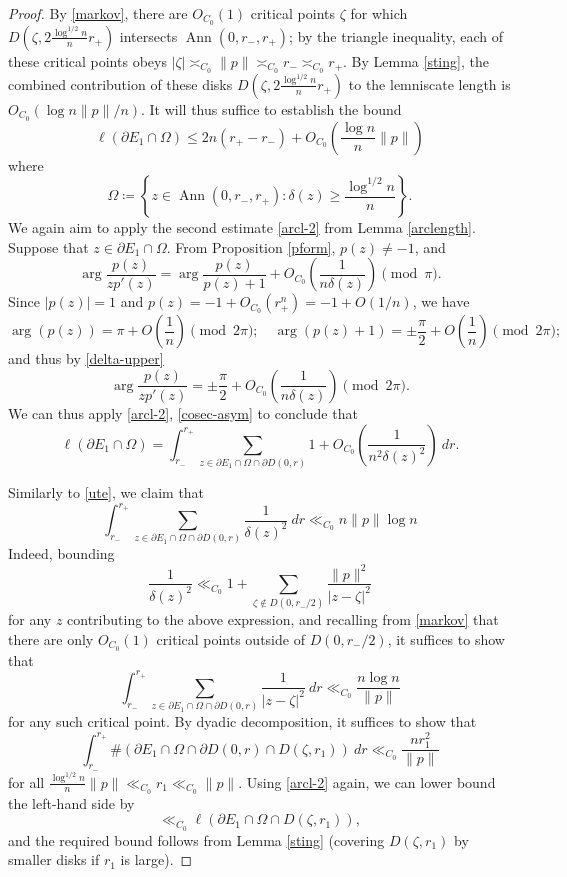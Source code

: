\documentclass[12pt]{amsart}
\renewcommand{\arg}{\operatorname{arg}}
\newcommand{\Ann}{\operatorname{Ann}}
\begin{document}
\begin{proof}
By \eqref{markov}, there are $O_{C_0}(1)$ critical points $\zeta$ for which $D(\zeta, 2\frac{\log^{1/2} n}{n} r_+)$ intersects $\Ann(0,r_-, r_+)$; by the triangle inequality, each of these critical points obeys $|\zeta| \asymp_{C_0} \|p\| \asymp_{C_0} r_- \asymp_{C_0} r_+$.  By Lemma \ref{sting}, the combined contribution of these disks $D(\zeta, 2\frac{\log^{1/2} n}{n} r_+)$ to the lemniscate length is $O_{C_0}(\log n \|p\|/n)$.
It will thus suffice to establish the bound
$$ \ell(\partial E_1 \cap \Omega) \leq 2n (r_+-r_-) + O_{C_0}\left(\frac{\log n}{n} \|p\| \right)$$
where
$$ \Omega \coloneqq \left\{ z \in \Ann(0,r_-,r_+): \delta(z) \geq \frac{\log^{1/2} n}{n} \right\}.$$
We again aim to apply the second estimate \eqref{arcl-2} from Lemma \ref{arclength}.  Suppose that $z \in \partial E_1 \cap \Omega$.
From Proposition \ref{pform}, $p(z) \neq -1$, and
$$ \arg \frac{p(z)}{zp'(z)} = \arg \frac{p(z)}{p(z)+1}
+ O_{C_0}\left(\frac{1}{n \delta(z)} \right) \pmod \pi.$$
Since $|p(z)|=1$ and $p(z) = -1 + O_{C_0}(r_+^n) = -1 + O(1/n)$, we have
$$ \arg(p(z)) = \pi + O\left(\frac{1}{n}\right) \pmod{2\pi}; \quad \arg(p(z)+1) = \pm \frac{\pi}{2} + O\left(\frac{1}{n}\right) \pmod{2\pi};$$
and thus by \eqref{delta-upper}
$$ \arg \frac{p(z)}{zp'(z)} = \pm \frac{\pi}{2} + O_{C_0}\left(\frac{1}{n \delta(z)} \right) \pmod{2\pi}.$$
We can thus apply \eqref{arcl-2}, \eqref{cosec-asym} to conclude that
$$
 \ell(\partial E_1 \cap \Omega) = \int_{r_-}^{r_+} \sum_{z \in \partial E_1 \cap \Omega \cap \partial D(0,r)} 1 + O_{C_0}\left( \frac{1}{n^2 \delta(z)^2} \right)\ dr.
$$

Similarly to \eqref{ute}, we claim that
\begin{equation}\label{ute-2}
     \int_{r_-}^{r_+} \sum_{z \in \partial E_1 \cap \Omega \cap \partial D(0,r)} \frac{1}{\delta(z)^2}\ dr \ll_{C_0} n \|p\| \log n
\end{equation}
Indeed, bounding
$$ \frac{1}{\delta(z)^2} \ll_{C_0} 1 + \sum_{\zeta \notin D(0,r_-/2)} \frac{\|p\|^2}{|z - \zeta|^2}$$
for any $z$ contributing to the above expression,
and recalling from \eqref{markov} that there are only $O_{C_0}(1)$ critical points outside of $D(0,r_-/2)$, it suffices to show that
$$ \int_{r_-}^{r_+} \sum_{z \in \partial E_1 \cap \Omega \cap \partial D(0,r)} \frac{1}{|z - \zeta|^2}\ dr \ll_{C_0} \frac{n \log n}{\|p\|}$$
for any such critical point.  By dyadic decomposition, it suffices to show that
$$ \int_{r_-}^{r_+} \# (\partial E_1 \cap \Omega \cap \partial D(0,r) \cap D(\zeta, r_1)) \ dr \ll_{C_0} \frac{n r_1^2}{\|p\|}$$
for all $\frac{\log^{1/2} n}{n} \|p\| \ll_{C_0} r_1 \ll_{C_0} \|p\|$.  Using \eqref{arcl-2} again, we can lower bound the left-hand side by
$$ \ll_{C_0} \ell( \partial E_1 \cap \Omega \cap D(\zeta,r_1)),$$
and the required bound follows from Lemma \ref{sting} (covering $D(\zeta,r_1)$ by smaller disks if $r_1$ is large).


\end{proof}
\end{document}
